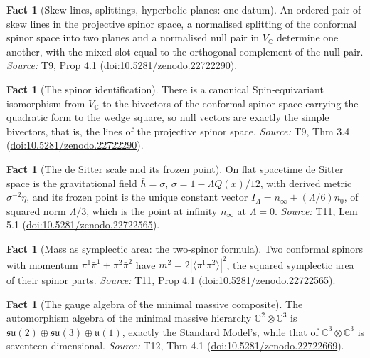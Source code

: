 \documentclass[11pt]{article}
\theoremstyle{definition}
\newtheorem{fact}[theorem]{Fact}
\theoremstyle{plain}
\providecommand{\C}{}\renewcommand{\C}{\mathbb{C}}
\providecommand{\Spin}{}\renewcommand{\Spin}{\mathrm{Spin}}
\providecommand{\hb}{}\renewcommand{\hb}{\bar{h}}
\providecommand{\su}{}\renewcommand{\su}{\mathfrak{su}}
\providecommand{\uu}{}\renewcommand{\uu}{\mathfrak{u}}
\providecommand{\br}{}\renewcommand{\br}[1]{\langle #1\rangle}
\begin{document}
\begin{fact}[Skew lines, splittings, hyperbolic planes: one datum]\label{c:correspondence.skew-lines-splittings-hyperbolic-planes-one}
An ordered pair of skew lines in the projective spinor space, a normalised splitting of the conformal spinor space into two planes and a normalised null pair in $V_\C$ determine one another, with the mixed slot equal to the orthogonal complement of the null pair.
\emph{Source:} T9, Prop 4.1 (\href{https://doi.org/10.5281/zenodo.22722290}{doi:10.5281/zenodo.22722290}).
\end{fact}

\begin{fact}[The spinor identification]\label{c:correspondence.spinor-identification}
There is a canonical $\Spin$-equivariant isomorphism from $V_\C$ to the bivectors of the conformal spinor space carrying the quadratic form to the wedge square, so null vectors are exactly the simple bivectors, that is, the lines of the projective spinor space.
\emph{Source:} T9, Thm 3.4 (\href{https://doi.org/10.5281/zenodo.22722290}{doi:10.5281/zenodo.22722290}).
\end{fact}

\begin{fact}[The de Sitter scale and its frozen point]\label{c:mass.de-sitter-scale-frozen-point}
On flat spacetime de Sitter space is the gravitational field $\hb = \sigma$, $\sigma = 1 - \Lambda Q(x)/12$, with derived metric $\sigma^{-2}\eta$, and its frozen point is the unique constant vector $I_\Lambda = n_\infty + (\Lambda/6)n_0$, of squared norm $\Lambda/3$, which is the point at infinity $n_\infty$ at $\Lambda = 0$.
\emph{Source:} T11, Lem 5.1 (\href{https://doi.org/10.5281/zenodo.22722565}{doi:10.5281/zenodo.22722565}).
\end{fact}

\begin{fact}[Mass as symplectic area: the two-spinor formula]\label{c:mass.mass-symplectic-area-two-twistor-formula}
Two conformal spinors with momentum $\pi^{1}\bar\pi^{1} + \pi^{2}\bar\pi^{2}$ have $m^{2} = 2|\br{\pi^{1}\pi^{2}}|^{2}$, the squared symplectic area of their spinor parts.
\emph{Source:} T11, Prop 4.1 (\href{https://doi.org/10.5281/zenodo.22722565}{doi:10.5281/zenodo.22722565}).
\end{fact}

\begin{fact}[The gauge algebra of the minimal massive composite]\label{c:standard-model.gauge-algebra-minimal-massive-composite}
The automorphism algebra of the minimal massive hierarchy $\C^{2} \otimes \C^{3}$ is $\su(2) \oplus \su(3) \oplus \uu(1)$, exactly the Standard Model's, while that of $\C^{3} \otimes \C^{3}$ is seventeen-dimensional.
\emph{Source:} T12, Thm 4.1 (\href{https://doi.org/10.5281/zenodo.22722669}{doi:10.5281/zenodo.22722669}).
\end{fact}
\end{document}
